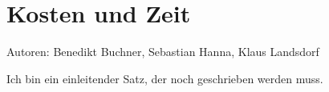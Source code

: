 \chapter{Kosten und Zeit}

Autoren: Benedikt Buchner, Sebastian Hanna, Klaus Landsdorf

Ich bin ein einleitender Satz, der noch geschrieben werden muss.

